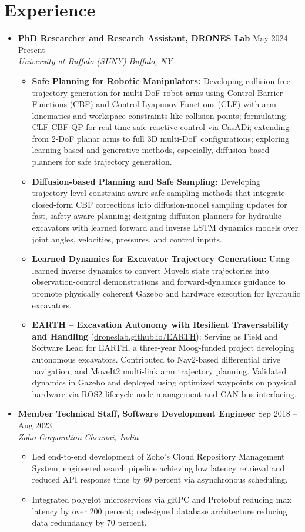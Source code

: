 \documentclass[letterpaper,10.5pt]{article}
\newcommand{\entryheading}[4]{%
  \vspace{2pt}%
  {\bfseries #1} \hfill #2 \\%
  {\itshape #3} \hfill {\itshape #4}%
  \vspace{-4pt}%
}
\newcommand{\resumeItemListStart}{%
  \begin{itemize}[leftmargin=0.2in, itemsep=-1pt, topsep=2pt, label={--}]\small%
}
\newcommand{\resumeItemListEnd}{\end{itemize}\vspace{-2pt}}
\newcommand{\resumeItem}[1]{\item #1}
\newcommand{\sectionliststart}{\begin{itemize}[leftmargin=0in, label={}, itemsep=2pt]}
\newcommand{\sectionlistend}{\end{itemize}}
\begin{document}
\section{Experience}
\sectionliststart
  \item
    \entryheading
      {PhD Researcher and Research Assistant, DRONES Lab}{May 2024 -- Present}
      {University at Buffalo (SUNY)}{Buffalo, NY}
    \resumeItemListStart
      \resumeItem{\textbf{Safe Planning for Robotic Manipulators:}
        Developing collision-free trajectory generation for multi-DoF robot arms using Control Barrier Functions (CBF)
        and Control Lyapunov Functions (CLF) with arm kinematics and workspace constraints like collision points; formulating
        CLF-CBF-QP for real-time safe reactive control via CasADi; extending from 2-DoF planar arms
        to full 3D multi-DoF configurations; exploring learning-based and generative methods, especially,
        diffusion-based planners for safe trajectory generation.}
      \resumeItem{\textbf{Diffusion-based Planning and Safe Sampling:}
        Developing trajectory-level constraint-aware safe sampling methods that integrate closed-form CBF corrections into diffusion-model sampling updates for fast, safety-aware planning; designing diffusion planners for hydraulic excavators with learned forward and inverse LSTM dynamics models over joint angles, velocities, pressures, and control inputs.}
      \resumeItem{\textbf{Learned Dynamics for Excavator Trajectory Generation:}
        Using learned inverse dynamics to convert MoveIt state trajectories into observation-control demonstrations and forward-dynamics guidance to promote physically coherent Gazebo and hardware execution for hydraulic excavators.}
      \resumeItem{\textbf{EARTH -- Excavation Autonomy with Resilient Traversability and Handling}
        (\href{https://droneslab.github.io/EARTH/}{droneslab.github.io/EARTH}):
        Serving as Field and Software Lead for EARTH, a three-year Moog-funded project developing autonomous excavators.
        Contributed to 
        Nav2-based differential drive navigation, and
        MoveIt2 multi-link arm trajectory planning. Validated dynamics in Gazebo and deployed using optimized waypoints on physical hardware via ROS2 lifecycle node management and CAN bus interfacing.}
    \resumeItemListEnd
  \item
    \entryheading
      {Member Technical Staff, Software Development Engineer}{Sep 2018 -- Aug 2023}
      {Zoho Corporation}{Chennai, India}
    \resumeItemListStart
      \resumeItem{Led end-to-end development of Zoho's Cloud Repository Management System; engineered search pipeline achieving low latency retrieval and reduced API response time by 60 percent via asynchronous scheduling.}
      \resumeItem{Integrated polyglot microservices via gRPC and Protobuf reducing max latency by over 200 percent; redesigned database architecture reducing data redundancy by 70 percent.}
    \resumeItemListEnd
\sectionlistend
\end{document}

